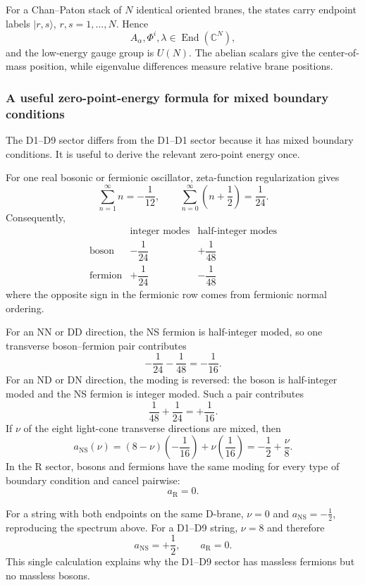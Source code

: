 \documentclass[
  10pt,
  a4paper,
  openany]{book}
\begin{document}
For a Chan--Paton stack of \(N\) identical oriented branes, the states
carry endpoint labels \(|r,s\rangle\), \(r,s=1,\ldots,N\). Hence \[
A_\alpha,\Phi^i,\lambda
\in\operatorname{End}(\mathbb C^N),
\] and the low-energy gauge group is \(U(N)\). The abelian scalars give
the center-of-mass position, while eigenvalue differences measure
relative brane positions.

\subsubsection{A useful zero-point-energy formula for mixed boundary
conditions}\label{a-useful-zero-point-energy-formula-for-mixed-boundary-conditions}

The D1--D9 sector differs from the D1--D1 sector because it has mixed
boundary conditions. It is useful to derive the relevant zero-point
energy once.

For one real bosonic or fermionic oscillator, zeta-function
regularization gives \[
\sum_{n=1}^\infty n
=-\frac1{12},
\qquad
\sum_{n=0}^\infty\left(n+\frac12\right)
=\frac1{24}.
\] Consequently, \[
\begin{array}{c|cc}
&\text{integer modes}&\text{half-integer modes}\\ \hline
\text{boson}
&-\dfrac1{24}
&+\dfrac1{48}\\[2mm]
\text{fermion}
&+\dfrac1{24}
&-\dfrac1{48}
\end{array}
\] where the opposite sign in the fermionic row comes from fermionic
normal ordering.

For an NN or DD direction, the NS fermion is half-integer moded, so one
transverse boson--fermion pair contributes \[
-\frac1{24}-\frac1{48}
=-\frac1{16}.
\] For an ND or DN direction, the moding is reversed: the boson is
half-integer moded and the NS fermion is integer moded. Such a pair
contributes \[
\frac1{48}+\frac1{24}
=+\frac1{16}.
\] If \(\nu\) of the eight light-cone transverse directions are mixed,
then \[
\boxed{
a_{\mathrm{NS}}(\nu)
=(8-\nu)\left(-\frac1{16}\right)
+\nu\left(\frac1{16}\right)
=-\frac12+\frac{\nu}{8}
}.
\] In the R sector, bosons and fermions have the same moding for every
type of boundary condition and cancel pairwise: \[
\boxed{a_{\mathrm R}=0}.
\]

For a string with both endpoints on the same D-brane, \(\nu=0\) and
\(a_{\mathrm{NS}}=-\frac12\), reproducing the spectrum above. For a
D1--D9 string, \(\nu=8\) and therefore \[
\boxed{
a_{\mathrm{NS}}=+\frac12,
\qquad
a_{\mathrm R}=0
}.
\] This single calculation explains why the D1--D9 sector has massless
fermions but no massless bosons.
\end{document}
